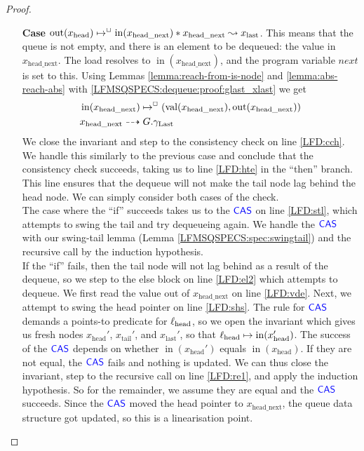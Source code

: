 \documentclass[a4paper, 10pt]{report}
\theoremstyle{definition}
\newcommand{\locN}[1]{\loc_{\mathrm{#1}}}
\newcommand{\lochead}{\locN{head}}
\newcommand{\nIn}[1]{\operatorname{in}(#1)}
\newcommand{\nVal}[1]{\operatorname{val}(#1)}
\newcommand{\nOut}[1]{\operatorname{out}(#1)}
\newcommand{\node}{x}
\newcommand{\nodeN}[1]{\node_{\mathrm{#1}}}
\newcommand{\nodehead}{\nodeN{head}}
\newcommand{\nodetail}{\nodeN{tail}}
\newcommand{\nodelast}{\nodeN{last}}
\newcommand{\nodeheadnext}{\nodeN{head\_next}}
\newcommand{\Qg}{G}
\newcommand{\glast}{\gname_{\mathrm{Last}}}
\newcommand{\isNode}[1]{\nIn{#1} \mapsto^{\persistently} (\nVal{#1}, \nOut{#1})}
\newcommand{\reach}[2]{#1 \leadsto #2}
\newcommand{\ar}[2]{#1 \dashrightarrow #2}
\begin{document}
\begin{proof}
\begin{itemize}
\begin{itemize}
      \item[\textbf{Case}] $\nOut{\nodehead} \mapsto^{\persistently} \nIn{\nodeheadnext} \star{} \reach{\nodeheadnext}{\nodelast}$. This means that the queue is not empty, and there is an element to be dequeued: the value in $\nodeheadnext$. The load resolves to $\nIn{\nodeheadnext}$, and the program variable $next$ is set to this. Using Lemmas \ref{lemma:reach-from-is-node} and \ref{lemma:abs-reach-abs} with \ref{LFMSQSPECS:dequeue:proof:glast_xlast} we get
      \begin{align}
        &\isNode{\nodeheadnext}\label{LFMSQSPECS:dequeue:proof:x_headnext_node}\\
        &\ar{\nodeheadnext}{\Qg.\glast}\label{LFMSQSPECS:dequeue:proof:x_headnext_glast}
      \end{align}
      We close the invariant and step to the consistency check on line \ref{LFD:cch}. We handle this similarly to the previous case and conclude that the consistency check succeeds, taking us to line \ref{LFD:hte} in the ``then'' branch. This line ensures that the dequeue will not make the tail node lag behind the head node. We can simply consider both cases of the check.\\
      The case where the ``if'' succeeds takes us to the $\textsf{\color{blue} CAS}$ on line \ref{LFD:stl}, which attempts to swing the tail and try dequeueing again. We handle the $\textsf{\color{blue} CAS}$ with our swing-tail lemma (Lemma \ref{LFMSQSPECS:spec:swingtail}) and the recursive call by the induction hypothesis.\\
      If the ``if'' fails, then the tail node will not lag behind as a result of the dequeue, so we step to the else block on line \ref{LFD:el2} which attempts to dequeue. We first read the value out of $\nodeheadnext$ on line \ref{LFD:vde}. Next, we attempt to swing the head pointer on line \ref{LFD:shs}. The rule for $\textsf{\color{blue} CAS}$ demands a points-to predicate for $\lochead$, so we open the invariant which gives us fresh nodes $\nodehead'$, $\nodetail'$, and $\nodelast'$, so that $\lochead \mapsto \nIn{\nodehead'}$. The success of the $\textsf{\color{blue} CAS}$ depends on whether $\nIn{\nodehead'}$ equals $\nIn{\nodehead}$. If they are not equal, the $\textsf{\color{blue} CAS}$ fails and nothing is updated. We can thus close the invariant, step to the recursive call on line \ref{LFD:re1}, and apply the induction hypothesis. So for the remainder, we assume they are equal and the $\textsf{\color{blue} CAS}$ succeeds. Since the $\textsf{\color{blue} CAS}$ moved the head pointer to $\nodeheadnext$, the queue data structure got updated, so this is a linearisation point.\\

\end{itemize}
\end{itemize}
\end{proof}
\end{document}
